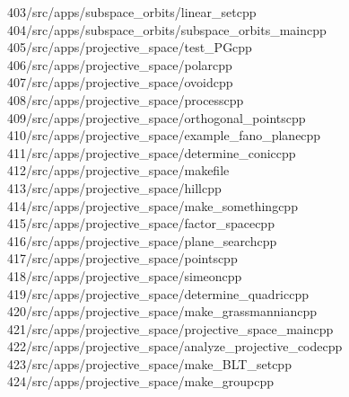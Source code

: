 \begin{tabbing}
403\>/src/apps/subspace\_orbits/linear\_setcpp\\[0pt]
404\>/src/apps/subspace\_orbits/subspace\_orbits\_maincpp\\[0pt]
405\>/src/apps/projective\_space/test\_PGcpp\\[0pt]
406\>/src/apps/projective\_space/polarcpp\\[0pt]
407\>/src/apps/projective\_space/ovoidcpp\\[0pt]
408\>/src/apps/projective\_space/processcpp\\[0pt]
409\>/src/apps/projective\_space/orthogonal\_pointscpp\\[0pt]
410\>/src/apps/projective\_space/example\_fano\_planecpp\\[0pt]
411\>/src/apps/projective\_space/determine\_coniccpp\\[0pt]
412\>/src/apps/projective\_space/makefile\\[0pt]
413\>/src/apps/projective\_space/hillcpp\\[0pt]
414\>/src/apps/projective\_space/make\_somethingcpp\\[0pt]
415\>/src/apps/projective\_space/factor\_spacecpp\\[0pt]
416\>/src/apps/projective\_space/plane\_searchcpp\\[0pt]
417\>/src/apps/projective\_space/pointscpp\\[0pt]
418\>/src/apps/projective\_space/simeoncpp\\[0pt]
419\>/src/apps/projective\_space/determine\_quadriccpp\\[0pt]
420\>/src/apps/projective\_space/make\_grassmanniancpp\\[0pt]
421\>/src/apps/projective\_space/projective\_space\_maincpp\\[0pt]
422\>/src/apps/projective\_space/analyze\_projective\_codecpp\\[0pt]
423\>/src/apps/projective\_space/make\_BLT\_setcpp\\[0pt]
424\>/src/apps/projective\_space/make\_groupcpp\\[0pt]

\end{tabbing}
